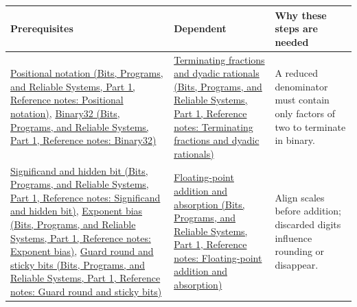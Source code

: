 \hypertarget{appendix-4ad47bdd269a-m005---arithmetic-error-and-reproducibility-learning-spine}{}

{\def\LTcaptype{none} %
\begin{longtable}[]{@{}
  >{\raggedright\arraybackslash}p{}
  >{\raggedright\arraybackslash}p{}
  >{\raggedright\arraybackslash}p{}@{}}
\toprule\noalign{}
\begin{minipage}[b]{\linewidth}\raggedright
Prerequisites
\end{minipage} & \begin{minipage}[b]{\linewidth}\raggedright
Dependent
\end{minipage} & \begin{minipage}[b]{\linewidth}\raggedright
Why these steps are needed
\end{minipage} \\
\midrule\noalign{}
\endhead
\bottomrule\noalign{}
\endlastfoot
\href{../01-Bits-Programs-and-Reliable-Systems-P01/main.pdf\#appendix-83c3f28f7bda}{Positional notation (Bits, Programs, and Reliable Systems, Part 1, Reference notes: Positional notation)}, \href{../01-Bits-Programs-and-Reliable-Systems-P01/main.pdf\#appendix-5057f9ad327f}{Binary32 (Bits, Programs, and Reliable Systems, Part 1, Reference notes: Binary32)} & \href{../01-Bits-Programs-and-Reliable-Systems-P01/main.pdf\#appendix-2a2f1b74bdd3}{Terminating fractions and dyadic rationals (Bits, Programs, and Reliable Systems, Part 1, Reference notes: Terminating fractions and dyadic rationals)} & A reduced denominator must contain only factors of two to terminate in binary. \\
\href{../01-Bits-Programs-and-Reliable-Systems-P01/main.pdf\#appendix-a24fd710cf67}{Significand and hidden bit (Bits, Programs, and Reliable Systems, Part 1, Reference notes: Significand and hidden bit)}, \href{../01-Bits-Programs-and-Reliable-Systems-P01/main.pdf\#appendix-2fae058c82e1}{Exponent bias (Bits, Programs, and Reliable Systems, Part 1, Reference notes: Exponent bias)}, \href{../01-Bits-Programs-and-Reliable-Systems-P01/main.pdf\#appendix-b572b631069b}{Guard round and sticky bits (Bits, Programs, and Reliable Systems, Part 1, Reference notes: Guard round and sticky bits)} & \href{../01-Bits-Programs-and-Reliable-Systems-P01/main.pdf\#appendix-a1b1b4580dfd}{Floating-point addition and absorption (Bits, Programs, and Reliable Systems, Part 1, Reference notes: Floating-point addition and absorption)} & Align scales before addition; discarded digits influence rounding or disappear. \\

\end{longtable}}
